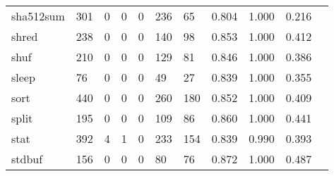 \begin{longtable}{lp{1.10cm}p{1.10cm}p{1.10cm}p{1.10cm}p{1.10cm}p{1.10cm}p{1.10cm}p{1.10cm}p{1.10cm}p{1.10cm}}
sha512sum &                    301 &                                  0 &                                 0 &                                0 &                               236 &                              65 &                          0.804 &                                 1.000 &                               0.216 \\
shred     &                    238 &                                  0 &                                 0 &                                0 &                               140 &                              98 &                          0.853 &                                 1.000 &                               0.412 \\
shuf      &                    210 &                                  0 &                                 0 &                                0 &                               129 &                              81 &                          0.846 &                                 1.000 &                               0.386 \\
sleep     &                     76 &                                  0 &                                 0 &                                0 &                                49 &                              27 &                          0.839 &                                 1.000 &                               0.355 \\
sort      &                    440 &                                  0 &                                 0 &                                0 &                               260 &                             180 &                          0.852 &                                 1.000 &                               0.409 \\
split     &                    195 &                                  0 &                                 0 &                                0 &                               109 &                              86 &                          0.860 &                                 1.000 &                               0.441 \\
stat      &                    392 &                                  4 &                                 1 &                                0 &                               233 &                             154 &                          0.839 &                                 0.990 &                               0.393 \\
stdbuf    &                    156 &                                  0 &                                 0 &                                0 &                                80 &                              76 &                          0.872 &                                 1.000 &                               0.487 \\

\end{longtable}
